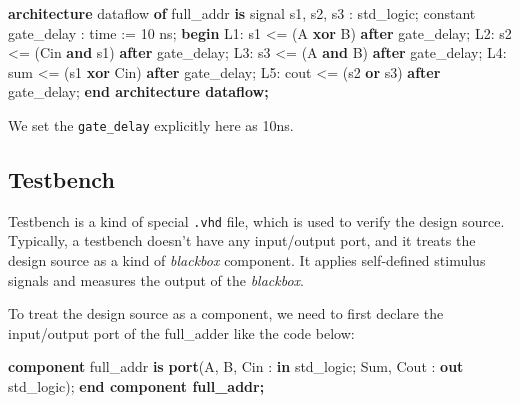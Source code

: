 \documentclass[
]{article}
\newenvironment{Shaded}{}{}
\newcommand{\ControlFlowTok}[1]{\textcolor[rgb]{0.00,0.44,0.13}{\textbf{#1}}}
\newcommand{\DataTypeTok}[1]{\textcolor[rgb]{0.56,0.13,0.00}{#1}}
\newcommand{\DecValTok}[1]{\textcolor[rgb]{0.25,0.63,0.44}{#1}}
\newcommand{\FunctionTok}[1]{\textcolor[rgb]{0.02,0.16,0.49}{#1}}
\newcommand{\KeywordTok}[1]{\textcolor[rgb]{0.00,0.44,0.13}{\textbf{#1}}}
\newcommand{\NormalTok}[1]{#1}
\newcommand{\OtherTok}[1]{\textcolor[rgb]{0.00,0.44,0.13}{#1}}
\begin{document}
\begin{Shaded}
\begin{Highlighting}[]
\ControlFlowTok{architecture} \DecValTok{dataflow} \KeywordTok{of} \FunctionTok{full\_addr} \KeywordTok{is}
    \OtherTok{signal}\NormalTok{ s1}\OtherTok{,}\NormalTok{ s2}\OtherTok{,}\NormalTok{ s3 }\OtherTok{:} \DataTypeTok{std\_logic}\NormalTok{;}
    \OtherTok{constant}\NormalTok{ gate\_delay }\OtherTok{:} \DataTypeTok{time} \OtherTok{:=} \DecValTok{10} \DataTypeTok{ns}\NormalTok{;}
\ControlFlowTok{begin}
    \DecValTok{L1}\OtherTok{:} \FunctionTok{s1} \OtherTok{\textless{}=}\NormalTok{ (A }\KeywordTok{xor}\NormalTok{ B) }\KeywordTok{after}\NormalTok{ gate\_delay;}
    \DecValTok{L2}\OtherTok{:} \FunctionTok{s2} \OtherTok{\textless{}=}\NormalTok{ (Cin }\KeywordTok{and}\NormalTok{ s1) }\KeywordTok{after}\NormalTok{ gate\_delay;}
    \DecValTok{L3}\OtherTok{:} \FunctionTok{s3} \OtherTok{\textless{}=}\NormalTok{ (A }\KeywordTok{and}\NormalTok{ B) }\KeywordTok{after}\NormalTok{ gate\_delay;}
    \DecValTok{L4}\OtherTok{:} \FunctionTok{sum} \OtherTok{\textless{}=}\NormalTok{ (s1 }\KeywordTok{xor}\NormalTok{ Cin) }\KeywordTok{after}\NormalTok{ gate\_delay;}
    \DecValTok{L5}\OtherTok{:} \FunctionTok{cout} \OtherTok{\textless{}=}\NormalTok{ (s2 }\KeywordTok{or}\NormalTok{ s3) }\KeywordTok{after}\NormalTok{ gate\_delay;}
\ControlFlowTok{end architecture dataflow;}
\end{Highlighting}
\end{Shaded}

We set the \texttt{gate\_delay} explicitly here as 10ns.

\hypertarget{testbench}{%
\subsection{Testbench}\label{testbench}}

Testbench is a kind of special \texttt{.vhd} file, which is used to
verify the design source. Typically, a testbench doesn't have any
input/output port, and it treats the design source as a kind of
\emph{blackbox} component. It applies self-defined stimulus signals and
measures the output of the \emph{blackbox}.

To treat the design source as a component, we need to first declare the
input/output port of the full\_adder like the code below:

\begin{Shaded}
\begin{Highlighting}[]
    \ControlFlowTok{component} \DecValTok{full\_addr} \KeywordTok{is} 
        \ControlFlowTok{port}\NormalTok{(A}\OtherTok{,}\NormalTok{ B}\OtherTok{,}\NormalTok{ Cin }\OtherTok{:} \KeywordTok{in} \DataTypeTok{std\_logic}\NormalTok{;}
\NormalTok{             Sum}\OtherTok{,}\NormalTok{ Cout }\OtherTok{:} \KeywordTok{out} \DataTypeTok{std\_logic}\NormalTok{);}
    \ControlFlowTok{end component full\_addr;}
\end{Highlighting}
\end{Shaded}
\end{document}
